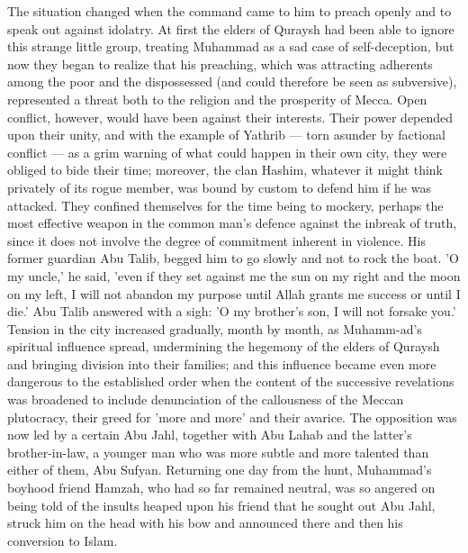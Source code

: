 \documentclass[10pt, twoside,openright]{book}
\begin{document}
The situation changed when the command came to him to preach openly and to speak out against 
idolatry. At first the elders of Quraysh had been able to ignore this strange little group, treating 
Muhammad as a sad case of self\hyp{}deception, but now they began to realize that his preaching, which was 
attracting adherents among the poor and the dispossessed (and could therefore be seen as subversive), 
represented a threat both to the religion and the prosperity of Mecca. Open conflict, however, would 
have been against their interests. Their power depended upon their unity, and with the example of 
Yathrib --- torn asunder by factional conflict --- as a grim warning of what could happen in their own 
city, they were obliged to bide their time; moreover, the clan Hashim, whatever it might think 
privately of its rogue member, was bound by custom to defend him if he was attacked. They confined 
themselves for the time being to mockery, perhaps the most effective weapon in the common man's 
defence against the inbreak of truth, since it does not involve the degree of commitment inherent in 
violence. His former guardian Abu Talib, begged him to go slowly and not to rock the boat. 'O my 
uncle,' he said, 'even if they set against me the sun on my right and the moon on my left, I will not 
abandon my purpose until Allah grants me success or until I die.' Abu Talib answered with a sigh: 'O 
my brother's son, I will not forsake you.' \\

Tension in the city increased gradually, month by month, as Muhamm\hyp{}ad's spiritual influence spread, 
undermining the hegemony of the elders of Quraysh and bringing division into their families; and this 
influence became even more dangerous to the established order when the content of the successive 
revelations was broadened to include denunciation of the callousness of the Meccan plutocracy, their 
greed for 'more and more' and their avarice. The opposition was now led by a certain Abu Jahl, 
together with Abu Lahab and the latter's brother\hyp{}in\hyp{}law, a younger man who was more subtle and more 
talented than either of them, Abu Sufyan. Returning one day from the hunt, Muhammad's boyhood friend 
Hamzah, who had so far remained neutral, was so angered on being told of the insults heaped upon his 
friend that he sought out Abu Jahl, struck him on the head with his bow and announced there and then 
his conversion to Islam. \\
\end{document}

